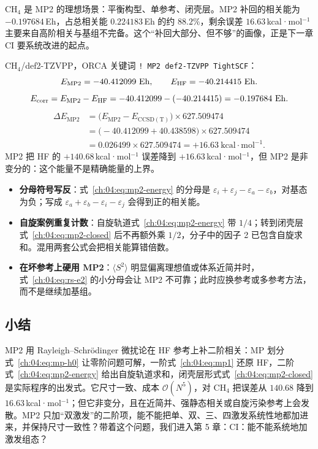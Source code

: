 CH$_4$ 是 MP2 的理想场景：平衡构型、单参考、闭壳层。MP2 补回的相关能为 $-0.197684$\,Eh，占总相关能 $0.224183$\,Eh 的约 $88.2\%$，剩余误差 $16.63$\,kcal·mol$^{-1}$ 主要来自高阶相关与基组不完备。这个“补回大部分、但不够”的画像，正是下一章 CI 要系统改进的起点。

\begin{ch4box}
CH$_4$/def2-TZVPP，ORCA 关键词 \texttt{! MP2 def2-TZVPP TightSCF}：
\[
E_{\mathrm{MP2}} = -40.412099\ \mathrm{Eh},
\qquad
E_{\mathrm{HF}} = -40.214415\ \mathrm{Eh}.
\]
\[
E_{\mathrm{corr}}
= E_{\mathrm{MP2}} - E_{\mathrm{HF}}
= -40.412099 - (-40.214415)
= -0.197684\ \mathrm{Eh}.
\]
\begin{align*}
\Delta E_{\mathrm{MP2}}
&= \big(E_{\mathrm{MP2}} - E_{\mathrm{CCSD(T)}}\big)\times 627.509474 \\
&= \big(-40.412099 + 40.438598\big)\times 627.509474 \\
&= 0.026499\times 627.509474
= +16.63\ \mathrm{kcal\cdot mol^{-1}}.
\end{align*}
MP2 把 HF 的 $+140.68$\,kcal·mol$^{-1}$ 误差降到 $+16.63$\,kcal·mol$^{-1}$，但 MP2 是非变分的：这个能量不是精确能量的上界。
\end{ch4box}

\begin{pitfall}
\begin{itemize}
  \item \textbf{分母符号写反}：式~\eqref{ch:04:eq:mp2-energy} 的分母是 $\varepsilon_i+\varepsilon_j-\varepsilon_a-\varepsilon_b$，对基态为负；写成 $\varepsilon_a+\varepsilon_b-\varepsilon_i-\varepsilon_j$ 会得到正的相关能。
  \item \textbf{自旋案例重复计数}：自旋轨道式~\eqref{ch:04:eq:mp2-energy} 带 $1/4$；转到闭壳层式~\eqref{ch:04:eq:mp2-closed} 后不再额外乘 $1/2$，分子中的因子 2 已包含自旋求和。混用两套公式会把相关能算错倍数。
  \item \textbf{在坏参考上硬用 MP2}：$\langle S^2\rangle$ 明显偏离理想值或体系近简并时，式~\eqref{ch:04:eq:rs-e2} 的小分母会让 MP2 不可靠；此时应换参考或多参考方法，而不是继续加基组。
\end{itemize}
\end{pitfall}

\subsection*{小结}
MP2 用 Rayleigh--Schrödinger 微扰论在 HF 参考上补二阶相关：MP 划分式~\eqref{ch:04:eq:mp-h0} 让零阶问题可解，一阶式~\eqref{ch:04:eq:mp1} 还原 HF，二阶式~\eqref{ch:04:eq:mp2-energy} 给出自旋轨道求和，闭壳层形式式~\eqref{ch:04:eq:mp2-closed} 是实际程序的出发式。它尺寸一致、成本 $\mathcal{O}(N^5)$，对 CH$_4$ 把误差从 $140.68$ 降到 $16.63$\,kcal·mol$^{-1}$；但它非变分，且在近简并、强静态相关或自旋污染参考上会发散。MP2 只加“双激发”的二阶项，能不能把单、双、三、四激发系统性地都加进来，并保持尺寸一致性？带着这个问题，我们进入第 5 章：CI：能不能系统地加激发组态？
